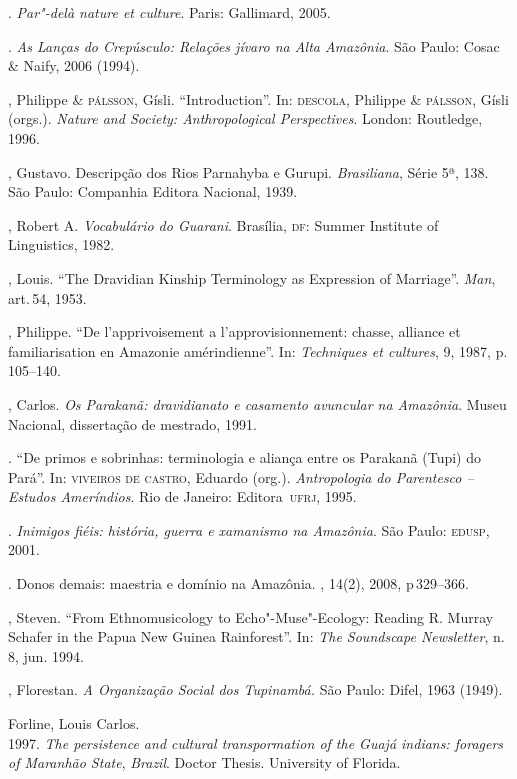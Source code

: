 \begin{bibliohedra}
\titidem. \emph{Par"-delà nature et culture}. Paris: Gallimard, 2005.

\titidem. \emph{As Lanças do Crepúsculo: Relações jívaro na
Alta Amazônia}. São Paulo: Cosac \& Naify, 2006 (1994).

, Philippe \& \textsc{pálsson}, Gísli. ``Introduction''. In: \textsc{descola}, Philippe \& \textsc{pálsson}, Gísli (orgs.). \emph{Nature and Society: Anthropological Perspectives}. London: Routledge, 1996.

, Gustavo. Descripção dos Rios Parnahyba e Gurupi.
\emph{Brasiliana}, Série 5ª, 138. São Paulo: Companhia Editora Nacional, 1939.

, Robert A. \emph{Vocabulário do Guarani}. Brasília, \textsc{df}: Summer
Institute of Linguistics, 1982.

, Louis. ``The Dravidian Kinship Terminology as Expression of
Marriage''. \emph{Man}, art.\,54, 1953.

, Philippe. ``De l'apprivoisement a l'approvisionnement: chasse,
alliance et familiarisation en Amazonie amérindienne''. In:
\emph{Techniques et cultures}, 9, 1987, p.\,105--140.

, Carlos. \emph{Os Parakanã: dravidianato e casamento avuncular na
Amazônia}. Museu Nacional, dissertação de mestrado, 1991.

\titidem. ``De primos e sobrinhas: terminologia e aliança entre os
Parakanã (Tupi) do Pará''. In: \textsc{viveiros de castro}, Eduardo (org.). \emph{Antropologia do Parentesco -- Estudos Ameríndios}. Rio de Janeiro: Editora~\textsc{ufrj}, 1995.

\titidem. \emph{Inimigos fiéis: história, guerra e xamanismo na
Amazônia}. São Paulo: \textsc{edusp}, 2001.

\titidem. Donos demais: maestria e domínio na Amazônia. , 14(2), 2008, p\,329--366.

, Steven. ``From Ethnomusicology to Echo"-Muse"-Ecology: Reading R.
Murray Schafer in the Papua New Guinea Rainforest''. In: \emph{The Soundscape
Newsletter}, n.\,8, jun. 1994.

, Florestan. \emph{A Organização Social dos Tupinambá.} São
Paulo: Difel, 1963 (1949).

Forline, Louis Carlos.\\
1997. \emph{The persistence and cultural transpormation of the
Guajá indians: foragers of Maranhão State}, \emph{Brazil}. Doctor
Thesis. University of Florida.


\end{bibliohedra}
